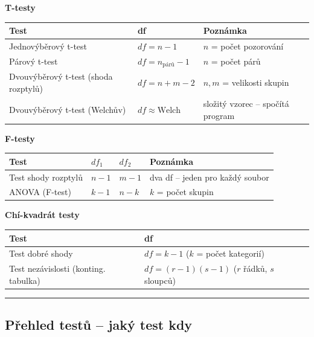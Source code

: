 \documentclass[a4paper, 11pt]{article}
\begin{document}
\medskip
\noindent\textbf{T-testy}

{\small
	\renewcommand{\arraystretch}{1.2}
	\begin{tabular}{p{} p{} p{}}
		\textbf{Test}                            & \textbf{df}                & \textbf{Poznámka}                     \\
		\midrule
		Jednovýběrový t-test                  & $df = n-1$                 & $n$ = počet pozorování              \\
		Párový t-test                          & $df = n_{\text{párů}}-1$ & $n$ = počet párů                    \\
		Dvouvýběrový t-test (shoda rozptylů) & $df = n+m-2$               & $n,m$ = velikosti skupin               \\
		Dvouvýběrový t-test (Welchův)        & $df \approx \text{Welch}$  & složitý vzorec -- spočítá program \\
	\end{tabular}

	\medskip
	\noindent\textbf{F-testy}

	\begin{tabular}{p{} p{} p{} p{}}
		\textbf{Test}        & $df_1$ & $df_2$ & \textbf{Poznámka}                 \\
		\midrule
		Test shody rozptylů & $n-1$  & $m-1$  & dva df -- jeden pro každý soubor \\
		ANOVA (F-test)       & $k-1$  & $n-k$  & $k$ = počet skupin                \\
	\end{tabular}

	\medskip
	\noindent\textbf{Chí-kvadrát testy}

	\begin{tabular}{p{} p{}}
		\textbf{Test}                         & \textbf{df}                                          \\
		\midrule
		Test dobré shody                     & $df = k-1$ \quad ($k$ = počet kategorií)           \\
		Test nezávislosti (konting. tabulka) & $df = (r-1)(s-1)$ \quad ($r$ řádků, $s$ sloupců) \\
	\end{tabular}
} %

\noindent\hrule\medskip

\subsection{Přehled testů -- jaký test kdy}
\end{document}
